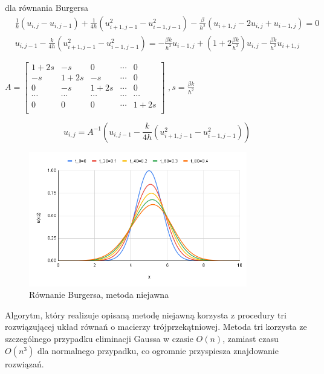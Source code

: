 \documentclass[a4paper,12pt]{article}
\begin{document}
dla równania Burgersa
\begin{equation}
\begin{split}
& \frac{1}{k}(u_{i,j}-u_{i,j-1})+\frac{1}{4h}(u_{i+1,j-1}^{2}-u_{i-1,j-1}^{2})-\frac{\beta}{h^{2}}(u_{i+1,j}-2u_{i,j}+u_{i-1,j})=0\\
& u_{i,j-1}-\frac{k}{4h}(u_{i+1,j-1}^{2}-u_{i-1,j-1}^{2})=-\frac{\beta k}{h^{2}}u_{i-1,j}+(1+2\frac{\beta k}{h^{2}})u_{i,j}-\frac{\beta k}{h^{2}}u_{i+1,j}
\end{split}
\end{equation}
\begin{center}
$A=
\begin{bmatrix}
1+2s & -s & 0 & \cdots & 0\\
-s & 1+2s & -s & \cdots & 0\\
0 & -s & 1+2s & \cdots & 0\\
\cdots & \cdots & \cdots & \cdots & \cdots\\
0 & 0 & 0 & \cdots & 1+2s\\
\end{bmatrix}$
$,s=\frac{\beta k}{h^{2}}$
\end{center}
\begin{equation}
u_{i,j}=A^{-1}(u_{i,j-1}-\frac{k}{4h}(u_{i+1,j-1}^{2}-u_{i-1,j-1}^{2}))
\end{equation}
\begin{figure}[h]
\caption{Równanie Burgersa, metoda niejawna}
\centering
\includegraphics[width=0.85\textwidth]{rys/9.png}
\end{figure}
\newline
Algorytm, który realizuje opisaną metodę niejawną korzysta z procedury tri rozwiązującej układ równań o macierzy trójprzekątniowej. Metoda tri korzysta ze szczególnego przypadku eliminacji Gaussa w czasie $O(n)$, zamiast czasu $O(n^3)$ dla normalnego przypadku, co ogromnie przyspiesza znajdowanie rozwiązań.
\newpage
\end{document}
